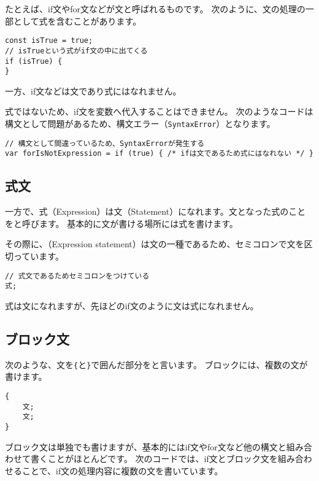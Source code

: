 たとえば、if文やfor文などが文と呼ばれるものです。
次のように、文の処理の一部として式を含むことがあります。

\begin{lstlisting}
const isTrue = true;
// isTrueという式がif文の中に出てくる
if (isTrue) {
}
\end{lstlisting}

一方、if文などは文であり式にはなれません。

式ではないため、if文を変数へ代入することはできません。
次のようなコードは構文として問題があるため、構文エラー（\texttt{SyntaxError}）となります。

\begin{lstlisting}
// 構文として間違っているため、SyntaxErrorが発生する
var forIsNotExpression = if (true) { /* ifは文であるため式にはなれない */ }
\end{lstlisting}

\hypertarget{expression-statement}{%
\subsection{式文}\label{expression-statement}}

一方で、式（Expression）は文（Statement）になれます。文となった式のことを\textbf{}と呼びます。
基本的に文が書ける場所には式を書けます。

その際に、\textbf{}（Expression
statement）は文の一種であるため、セミコロンで文を区切っています。

\begin{lstlisting}
// 式文であるためセミコロンをつけている
式;
\end{lstlisting}

式は文になれますが、先ほどのif文のように文は式になれません。

\hypertarget{block-statement}{%
\subsection{ブロック文}\label{block-statement}}

次のような、文を\texttt{\{}と\texttt{\}}で囲んだ部分を\textbf{}と言います。
ブロックには、複数の文が書けます。

\begin{lstlisting}
{
    文;
    文;
}
\end{lstlisting}

ブロック文は単独でも書けますが、基本的にはif文やfor文など他の構文と組み合わせて書くことがほとんどです。
次のコードでは、if文とブロック文を組み合わせることで、if文の処理内容に複数の文を書いています。

